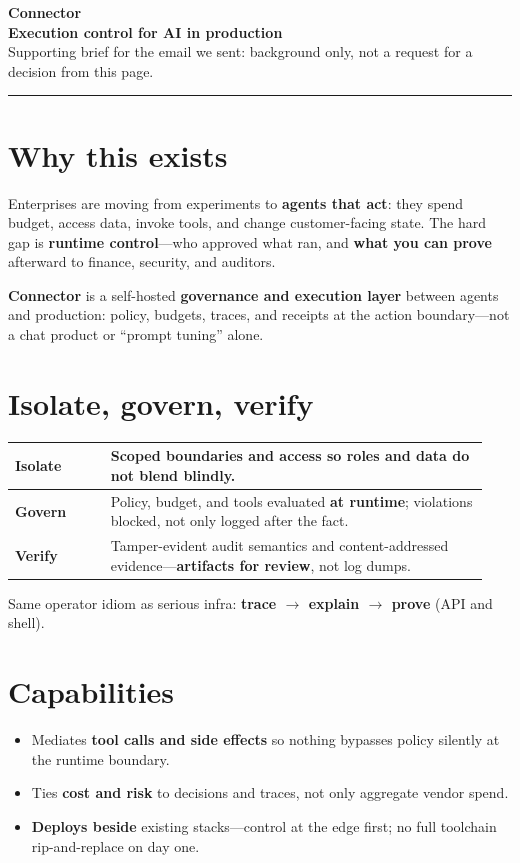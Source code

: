\documentclass[10pt]{article}
\newcommand{\muted}[1]{\textcolor{textmuted}{#1}}
\begin{document}
\pagestyle{empty}
\thispagestyle{empty}

{\fontsize{15}{17}\selectfont\bfseries Connector}\\[0.1em]
{\fontsize{10}{12}\selectfont\bfseries Execution control for AI in production}\\[0.25em]
{\small\muted{Supporting brief for the email we sent: background only, not a request for a decision from this page.}}

\vspace{0.22em}
\noindent\rule{\linewidth}{0.5pt}

\section{Why this exists}
Enterprises are moving from experiments to \textbf{agents that act}: they spend budget, access data, invoke tools, and change customer-facing state. The hard gap is \textbf{runtime control}---who approved what ran, and \textbf{what you can prove} afterward to finance, security, and auditors.

\textbf{Connector} is a self-hosted \textbf{governance and execution layer} between agents and production: policy, budgets, traces, and receipts at the action boundary---not a chat product or ``prompt tuning'' alone.

\section{Isolate, govern, verify}
\renewcommand{\arraystretch}{1.05}
\begin{tabular}{@{}>{\bfseries}p{0.19\linewidth} p{0.75\linewidth}@{}}
\toprule
Isolate & Scoped boundaries and access so roles and data do not blend blindly. \\
\midrule
Govern & Policy, budget, and tools evaluated \textbf{at runtime}; violations blocked, not only logged after the fact. \\
\midrule
Verify & Tamper-evident audit semantics and content-addressed evidence---\textbf{artifacts for review}, not log dumps. \\
\bottomrule
\end{tabular}

\vspace{0.06em}
{\footnotesize\muted{Same operator idiom as serious infra: \textbf{trace $\rightarrow$ explain $\rightarrow$ prove} (API and shell).}}

\section{Capabilities}
\begin{itemize}
  \item Mediates \textbf{tool calls and side effects} so nothing bypasses policy silently at the runtime boundary.
  \item Ties \textbf{cost and risk} to decisions and traces, not only aggregate vendor spend.
  \item \textbf{Deploys beside} existing stacks---control at the edge first; no full toolchain rip-and-replace on day one.
\end{itemize}
\end{document}
